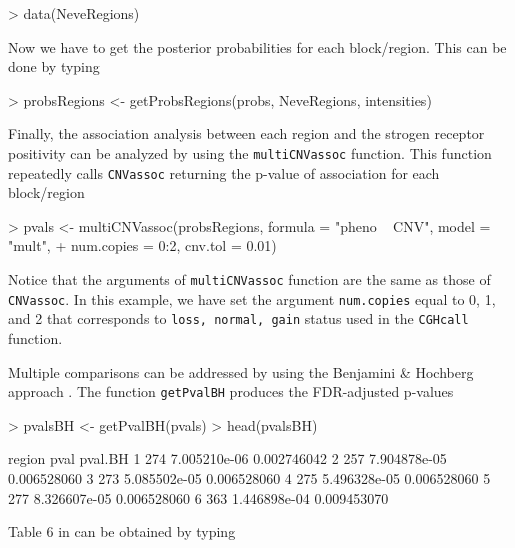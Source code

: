 \documentclass[11pt]{article}
\begin{document}
\begin{Schunk}
\begin{Sinput}
> data(NeveRegions)
\end{Sinput}
\end{Schunk}

%
Now we have to get the posterior probabilities for each block/region. This can be done by typing
%

\begin{Schunk}
\begin{Sinput}
> probsRegions <- getProbsRegions(probs, NeveRegions, intensities)
\end{Sinput}
\end{Schunk}

%
Finally, the association analysis between each region and the strogen receptor positivity can be analyzed by using the {\tt multiCNVassoc} 
function. This function repeatedly calls {\tt CNVassoc} returning the p-value of association for each block/region
%

\begin{Schunk}
\begin{Sinput}
> pvals <- multiCNVassoc(probsRegions, formula = "pheno ~ CNV", model = "mult", 
+ num.copies = 0:2, cnv.tol = 0.01)
\end{Sinput}
\end{Schunk}

%
Notice that the arguments of {\tt multiCNVassoc} function are the same as those of {\tt CNVassoc}. In this example, we have set the 
argument {\tt num.copies} equal to 0, 1, and 2 that corresponds to {\tt loss, normal, gain} status used in the {\tt CGHcall} function.

Multiple comparisons can be addressed by using the Benjamini \& Hochberg approach \cite{BenHoc95}. The function {\tt getPvalBH} produces the FDR-adjusted p-values
%

\begin{Schunk}
\begin{Sinput}
> pvalsBH <- getPvalBH(pvals)
> head(pvalsBH)
\end{Sinput}
\begin{Soutput}
  region         pval     pval.BH
1    274 7.005210e-06 0.002746042
2    257 7.904878e-05 0.006528060
3    273 5.085502e-05 0.006528060
4    275 5.496328e-05 0.006528060
5    277 8.326607e-05 0.006528060
6    363 1.446898e-04 0.009453070
\end{Soutput}
\end{Schunk}

%
Table 6 in \cite{GonSubEsc09} can be obtained by typing
%
\end{document}
